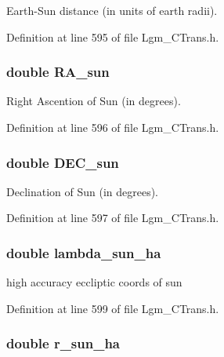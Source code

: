 Earth-Sun distance (in units of earth radii). 



Definition at line 595 of file Lgm\_\-CTrans.h.\hypertarget{struct_lgm___c_trans_ebb1769343863f3c66a44cc6f97ea836}{
\subsubsection[{RA\_\-sun}]{\setlength{\rightskip}{0pt plus 5cm}double {\bf RA\_\-sun}}}
\label{struct_lgm___c_trans_ebb1769343863f3c66a44cc6f97ea836}


Right Ascention of Sun (in degrees). 



Definition at line 596 of file Lgm\_\-CTrans.h.\hypertarget{struct_lgm___c_trans_b19a9ee35ac020d246368a77d45f24fc}{
\subsubsection[{DEC\_\-sun}]{\setlength{\rightskip}{0pt plus 5cm}double {\bf DEC\_\-sun}}}
\label{struct_lgm___c_trans_b19a9ee35ac020d246368a77d45f24fc}


Declination of Sun (in degrees). 



Definition at line 597 of file Lgm\_\-CTrans.h.\hypertarget{struct_lgm___c_trans_7ffa9e1f08f4d0cb1e671f68a3e02795}{
\subsubsection[{lambda\_\-sun\_\-ha}]{\setlength{\rightskip}{0pt plus 5cm}double {\bf lambda\_\-sun\_\-ha}}}
\label{struct_lgm___c_trans_7ffa9e1f08f4d0cb1e671f68a3e02795}


high accuracy eccliptic coords of sun 



Definition at line 599 of file Lgm\_\-CTrans.h.\hypertarget{struct_lgm___c_trans_6a356ec9b9109cc0b9839cd61cffab28}{
\subsubsection[{r\_\-sun\_\-ha}]{\setlength{\rightskip}{0pt plus 5cm}double {\bf r\_\-sun\_\-ha}}}
\label{struct_lgm___c_trans_6a356ec9b9109cc0b9839cd61cffab28}



